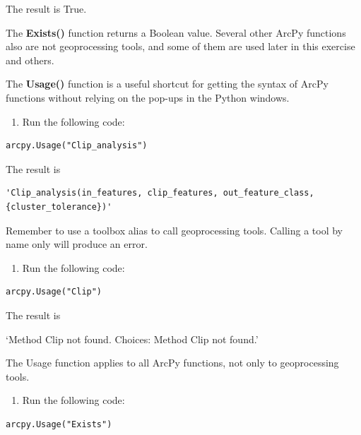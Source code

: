 \documentclass[
]{article}
\providecommand{\tightlist}{%
  \setlength{\itemsep}{0pt}\setlength{\parskip}{0pt}}
\begin{document}
The result is True.

The \textbf{Exists()} function returns a Boolean value. Several other
ArcPy functions also are not geoprocessing tools, and some of them are
used later in this exercise and others.

The \textbf{Usage()} function is a useful shortcut for getting the
syntax of ArcPy functions without relying on the pop-ups in the Python
windows.

\begin{enumerate}
\def\labelenumi{\arabic{enumi}.}
\setcounter{enumi}{1}
\tightlist
\item
  Run the following code:
\end{enumerate}

\begin{verbatim}
arcpy.Usage("Clip_analysis")
\end{verbatim}

The result is

\begin{verbatim}
'Clip_analysis(in_features, clip_features, out_feature_class, {cluster_tolerance})'
\end{verbatim}

Remember to use a toolbox alias to call geoprocessing tools. Calling a
tool by name only will produce an error.

\begin{enumerate}
\def\labelenumi{\arabic{enumi}.}
\setcounter{enumi}{2}
\tightlist
\item
  Run the following code:
\end{enumerate}

\begin{verbatim}
arcpy.Usage("Clip")
\end{verbatim}

The result is

`Method Clip not found. Choices: Method Clip not found.'

The Usage function applies to all ArcPy functions, not only to
geoprocessing tools.

\begin{enumerate}
\def\labelenumi{\arabic{enumi}.}
\setcounter{enumi}{3}
\tightlist
\item
  Run the following code:
\end{enumerate}

\begin{verbatim}
arcpy.Usage("Exists")
\end{verbatim}
\end{document}
